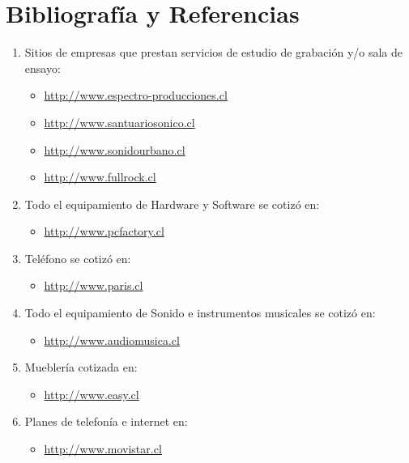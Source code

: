 \section{Bibliografía y Referencias}
\begin{enumerate}
\item Sitios de empresas que prestan servicios de estudio de grabación y/o sala de ensayo:
\begin{itemize}
   \item   \url{http://www.espectro-producciones.cl}
   \item   \url{http://www.santuariosonico.cl}
   \item   \url{http://www.sonidourbano.cl}
   \item   \url{http://www.fullrock.cl}
\end{itemize}

\item Todo el equipamiento de Hardware y Software se cotizó en:
\begin{itemize}
   \item \url{http://www.pcfactory.cl}
\end{itemize}
\item Teléfono se cotizó en:
\begin{itemize}
   \item \url{http://www.paris.cl}
\end{itemize} 
\item Todo el equipamiento de Sonido e instrumentos musicales se cotizó en:
\begin{itemize}
   \item  \url{http://www.audiomusica.cl}
\end{itemize}
\item Mueblería cotizada en:
\begin{itemize}
   \item \url{http://www.easy.cl}
\end{itemize}
\item Planes de telefonía e internet en:
\begin{itemize}
   \item \url{http://www.movistar.cl}
\end{itemize}
\end{enumerate}
